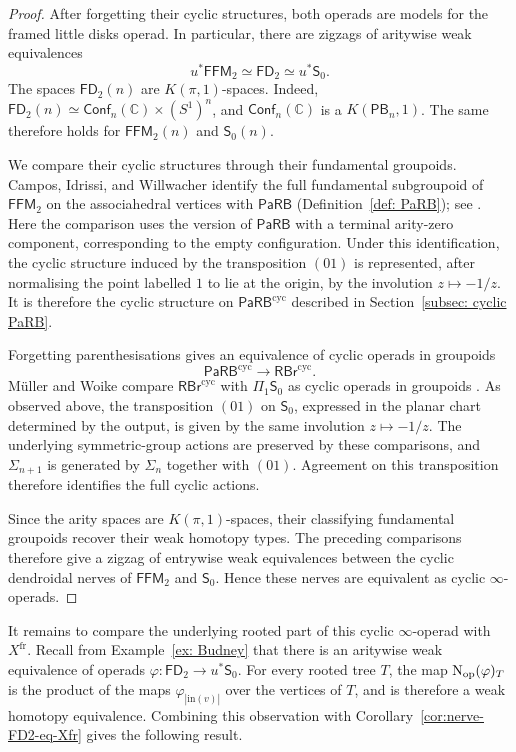 \documentclass{amsart}
\newcommand{\PaRB}{\mathsf{PaRB}}
\newcommand{\nerve}{\textnormal{N}}
\newcommand{\PB}{\mathsf{PB}} %
\newcommand{\Conf}{\mathsf{Conf}}%
\theoremstyle{definition}
\numberwithin{equation}{section}
\begin{document}
\begin{proof}
After forgetting their cyclic structures, both operads are models for
the framed little disks operad. In particular, there are zigzags of
aritywise weak equivalences
\[
u^*\mathsf{FFM}_2
\simeq
\mathsf{FD}_2
\simeq
u^*\mathsf S_0.
\]
The spaces $\mathsf{FD}_2(n)$ are $K(\pi,1)$-spaces. Indeed,
$\mathsf{FD}_2(n)\simeq
\Conf_n(\mathbb C)\times(S^1)^n$, and
$\Conf_n(\mathbb C)$ is a $K(\PB_n,1)$. The same therefore holds for
$\mathsf{FFM}_2(n)$ and $\mathsf S_0(n)$.

We compare their cyclic structures through their fundamental
groupoids. Campos, Idrissi, and Willwacher identify the full
fundamental subgroupoid of $\mathsf{FFM}_2$ on the associahedral
vertices with $\PaRB$ (Definition~\ref{def: PaRB}); see
\cite[Section~3.1]{campos2019configuration}. Here the comparison uses
the version of $\PaRB$ with a terminal arity-zero component,
corresponding to the empty configuration. Under this identification,
the cyclic structure induced by the transposition $(01)$ is
represented, after normalising the point labelled $1$ to lie at the
origin, by the involution $z\mapsto-1/z$. It is therefore the cyclic
structure on $\PaRB^{\mathrm{cyc}}$ described in
Section~\ref{subsec: cyclic PaRB}.

Forgetting parenthesisations gives an equivalence of cyclic operads in
groupoids
\[
\PaRB^{\mathrm{cyc}}
\longrightarrow
\mathsf{RBr}^{\mathrm{cyc}}.
\]
Müller and Woike compare $\mathsf{RBr}^{\mathrm{cyc}}$ with
$\Pi_1\mathsf S_0$ as cyclic operads in groupoids
\cite[Proposition~5.3]{cyclic_ribbon}. As observed above,
the transposition $(01)$ on $\mathsf S_0$, expressed in the planar
chart determined by the output, is given by the same involution
$z\mapsto-1/z$. The underlying symmetric-group actions are preserved
by these comparisons, and $\Sigma_{n+1}$ is generated by $\Sigma_n$
together with $(01)$. Agreement on this transposition therefore
identifies the full cyclic actions.

Since the arity spaces are $K(\pi,1)$-spaces, their classifying
fundamental groupoids recover their weak homotopy types. The preceding
comparisons therefore give a zigzag of entrywise weak equivalences
between the cyclic dendroidal nerves of $\mathsf{FFM}_2$ and
$\mathsf S_0$. Hence these nerves are equivalent as cyclic
$\infty$-operads.
\end{proof}

It remains to compare the underlying rooted part of this cyclic
$\infty$-operad with $X^{\mathrm{fr}}$. Recall from
Example~\ref{ex: Budney} that there is an aritywise weak equivalence
of operads
$\varphi\colon\mathsf{FD}_2\to u^*\mathsf S_0$. For every rooted tree
$T$, the map $\nerve_{\mathrm{op}}(\varphi)_T$ is the product of the
maps $\varphi_{|\mathrm{in}(v)|}$ over the vertices of $T$, and is
therefore a weak homotopy equivalence. Combining this observation
with Corollary~\ref{cor:nerve-FD2-eq-Xfr} gives the following result.
\end{document}
